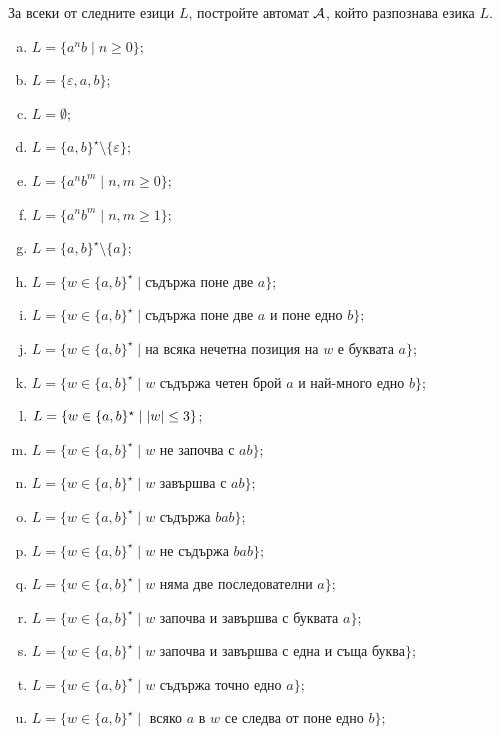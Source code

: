 \begin{problem}
  За всеки от следните езици $L$, постройте автомат $\mathcal{A}$, който разпознава езика $L$.
  \begin{enumerate}[a)]
  \item 
    $L = \{a^nb\mid n \geq 0\}$;
  \item
    $L = \{\varepsilon, a,b\}$;
  \item
    $L = \emptyset$;
  \item
    $L = \{a,b\}^\star\setminus\{\varepsilon\}$;
  \item
    $L = \{a^nb^m\mid n,m \geq 0\}$;
  \item
    $L = \{a^nb^m\mid n,m \geq 1\}$;
  \item
    $L = \{a,b\}^\star \setminus \{a\}$;
  \item
    $L = \{w \in \{a,b\}^\star \mid \mbox{съдържа поне две }a\}$;
  \item
    $L = \{w \in \{a,b\}^\star \mid \mbox{съдържа поне две }a\mbox{ и поне едно }b\}$;
  \item
    $L = \{w \in \{a,b\}^\star \mid \mbox{на всяка нечетна позиция на }w\mbox{ е буквата }a\}$;
  \item
    $L = \{w \in \{a,b\}^\star \mid w\mbox{ съдържа четен брой }a\mbox{ и най-много едно }b\}$;
  \item
    $L = \{w \in \{a,b\}^\star\mid \lvert{w}\rvert \leq 3\}$;
  \item
    $L = \{w \in \{a,b\}^\star \mid w \mbox{ не започва с }ab\}$;
  \item
    $L = \{w \in \{a,b\}^\star \mid w \mbox{ завършва с }ab\}$;
  \item
    $L = \{w \in \{a,b\}^\star \mid w \mbox{ съдържа }bab\}$;
  \item
    $L = \{w \in \{a,b\}^\star \mid w \mbox{ не съдържа }bab\}$;
  \item
    $L = \{w \in \{a,b\}^\star \mid w \mbox{ няма две последователни }a\}$;
  \item
    $L = \{w \in \{a,b\}^\star \mid w\mbox{ започва и завършва с буквата } a\}$;
  \item
    $L = \{w \in \{a,b\}^\star \mid w\mbox{ започва и завършва с една и съща буква}\}$;
  \item
    $L = \{w \in \{a,b\}^\star \mid w \mbox{ съдържа точно едно }a\}$;
  \item
    $L = \{w \in \{a,b\}^\star \mid \mbox{ всяко }a\mbox{ в }w\mbox{ се следва от поне едно }b\}$;

\end{enumerate}
\end{problem}
